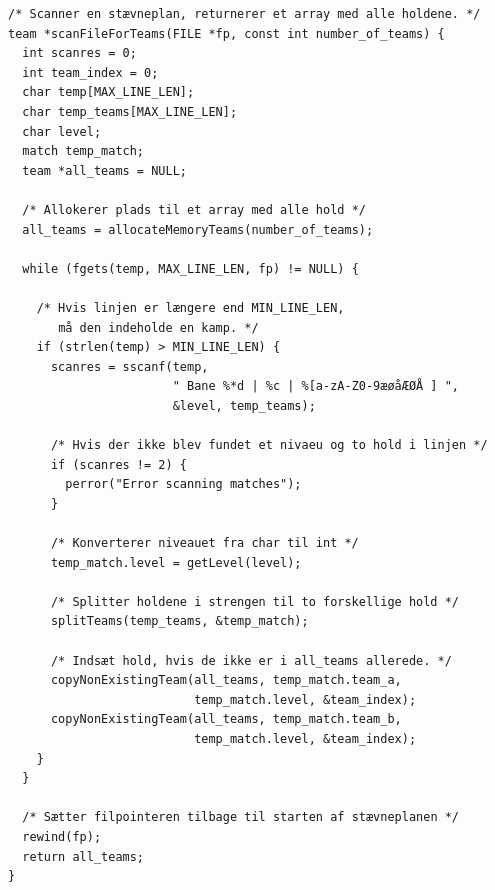 \begin{source}
\begin{verbatim}
/* Scanner en stævneplan, returnerer et array med alle holdene. */
team *scanFileForTeams(FILE *fp, const int number_of_teams) {
  int scanres = 0;
  int team_index = 0;
  char temp[MAX_LINE_LEN];
  char temp_teams[MAX_LINE_LEN];
  char level;
  match temp_match;
  team *all_teams = NULL;

  /* Allokerer plads til et array med alle hold */
  all_teams = allocateMemoryTeams(number_of_teams);

  while (fgets(temp, MAX_LINE_LEN, fp) != NULL) {

    /* Hvis linjen er længere end MIN_LINE_LEN, 
       må den indeholde en kamp. */
    if (strlen(temp) > MIN_LINE_LEN) {
      scanres = sscanf(temp, 
                       " Bane %*d | %c | %[a-zA-Z0-9æøåÆØÅ ] ", 
                       &level, temp_teams);

      /* Hvis der ikke blev fundet et nivaeu og to hold i linjen */
      if (scanres != 2) {
        perror("Error scanning matches");
      }

      /* Konverterer niveauet fra char til int */
      temp_match.level = getLevel(level);

      /* Splitter holdene i strengen til to forskellige hold */
      splitTeams(temp_teams, &temp_match);

      /* Indsæt hold, hvis de ikke er i all_teams allerede. */
      copyNonExistingTeam(all_teams, temp_match.team_a, 
                          temp_match.level, &team_index);
      copyNonExistingTeam(all_teams, temp_match.team_b, 
                          temp_match.level, &team_index);
    }
  }

  /* Sætter filpointeren tilbage til starten af stævneplanen */
  rewind(fp);
  return all_teams;
}
\end{verbatim}
\label{code:scanFileForTeams}
\end{source}

